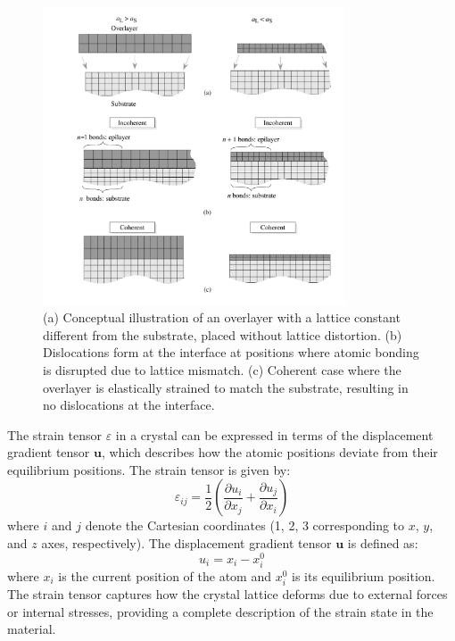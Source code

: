 \begin{figure}[h!]
    \centering
    \includegraphics[width=0.8\textwidth]{img/coherentAndIncoherent.png}
    \caption{\small (a) Conceptual illustration of an overlayer with a lattice constant different from the substrate, placed without lattice distortion. (b) Dislocations form at the interface at positions where atomic bonding is disrupted due to lattice mismatch. (c) Coherent case where the overlayer is elastically strained to match the substrate, resulting in no dislocations at the interface.}
    \label{fig:coherent_incoherent}
\end{figure}
The strain tensor $\varepsilon$ in a crystal can be expressed in terms of the displacement gradient tensor $\mathbf{u}$, which describes how the atomic positions deviate from their equilibrium positions. The strain tensor is given by:
\begin{equation*}
 \varepsilon_{ij} = \frac{1}{2} \left( \frac{\partial u_i}{\partial x_j} + \frac{\partial u_j}{\partial x_i} \right)
\end{equation*}
where $i$ and $j$ denote the Cartesian coordinates (1, 2, 3 corresponding to $x$, $y$, and $z$ axes, respectively). The displacement gradient tensor $\mathbf{u}$ is defined as:
\begin{equation*}
 u_i = x_i - x_i^0
 \end{equation*}
 where $x_i$ is the current position of the atom and $x_i^0$ is its equilibrium position. The strain tensor captures how the crystal lattice deforms due to external forces or internal stresses, providing a complete description of the strain state in the material.
 
